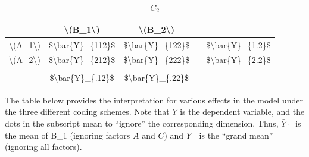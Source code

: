 \documentclass[]{book}
\begin{document}
\[C_2\]

\begin{table}[H]
\centering
\begin{tabular}{c|c|c|c|c}
\hline
 & \textbackslash{}(B\_1\textbackslash{}) & \textbackslash{}(B\_2\textbackslash{}) &  & \\
\hline
\textbackslash{}(A\_1\textbackslash{}) & \$\textbackslash{}bar\{Y\}\_\{112\}\$ & \$\textbackslash{}bar\{Y\}\_\{122\}\$ &  & \$\textbackslash{}bar\{Y\}\_\{1.2\}\$\\
\hline
\textbackslash{}(A\_2\textbackslash{}) & \$\textbackslash{}bar\{Y\}\_\{212\}\$ & \$\textbackslash{}bar\{Y\}\_\{222\}\$ &  & \$\textbackslash{}bar\{Y\}\_\{2.2\}\$\\
\hline
 &  &  &  & \\
\hline
 & \$\textbackslash{}bar\{Y\}\_\{.12\}\$ & \$\textbackslash{}bar\{Y\}\_\{.22\}\$ &  & \\
\hline
\end{tabular}
\end{table}

The table below provides the interpretation for various effects in the model under the three different coding schemes. Note that \(Y\) is the dependent variable, and the dots in the subscript mean to ``ignore'' the corresponding dimension. Thus, \(\bar{Y}_{.1.}\) is the mean of B\_1 (ignoring factors \(A\) and \(C\)) and \(\bar{Y}_{...}\) is the ``grand mean'' (ignoring all factors).
\end{document}
